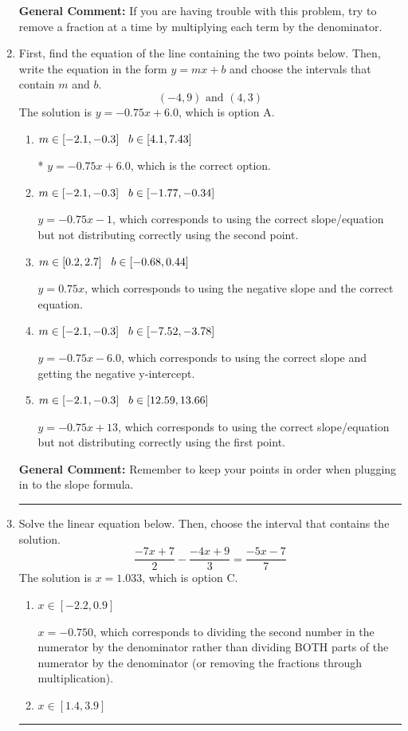 \documentclass{extbook}[14pt]
\newcommand{\litem}[1]{\item #1

\rule{\textwidth}{0.4pt}}
\begin{document}
\begin{enumerate}
{\textbf{General Comment:} If you are having trouble with this problem, try to remove a fraction at a time by multiplying each term by the denominator.
}
\litem{
First, find the equation of the line containing the two points below. Then, write the equation in the form $ y=mx+b $ and choose the intervals that contain $m$ and $b$.
\[ (-4, 9) \text{ and } (4, 3) \]The solution is \( y = -0.75x + 6.0 \), which is option A.\begin{enumerate}[label=\Alph*.]
\item \( m \in [-2.1, -0.3] \hspace*{3mm} b \in [4.1, 7.43] \)

* $y = -0.75x + 6.0$, which is the correct option.
\item \( m \in [-2.1, -0.3] \hspace*{3mm} b \in [-1.77, -0.34] \)

 $y = -0.75x -1$, which corresponds to using the correct slope/equation but not distributing correctly using the second point.
\item \( m \in [0.2, 2.7] \hspace*{3mm} b \in [-0.68, 0.44] \)

 $y = 0.75x$, which corresponds to using the negative slope and the correct equation.
\item \( m \in [-2.1, -0.3] \hspace*{3mm} b \in [-7.52, -3.78] \)

 $y = -0.75x -6.0$, which corresponds to using the correct slope and getting the negative y-intercept.
\item \( m \in [-2.1, -0.3] \hspace*{3mm} b \in [12.59, 13.66] \)

 $y = -0.75x + 13$, which corresponds to using the correct slope/equation but not distributing correctly using the first point.
\end{enumerate}

\textbf{General Comment:} Remember to keep your points in order when plugging in to the slope formula.
}
\litem{
Solve the linear equation below. Then, choose the interval that contains the solution.
\[ \frac{-7x + 7}{2} - \frac{-4x + 9}{3} = \frac{-5x -7}{7} \]The solution is \( x = 1.033 \), which is option C.\begin{enumerate}[label=\Alph*.]
\item \( x \in [-2.2, 0.9] \)

 $x = -0.750$, which corresponds to dividing the second number in the numerator by the denominator rather than dividing BOTH parts of the numerator by the denominator (or removing the fractions through multiplication).
\item \( x \in [1.4, 3.9] \)


\end{enumerate}}
\end{enumerate}
\end{document}
